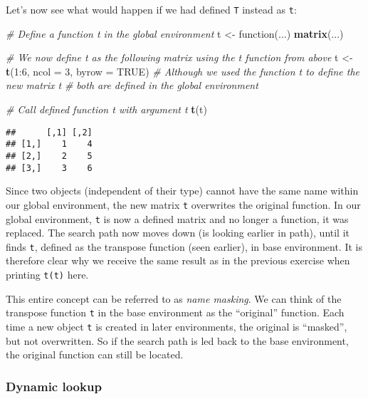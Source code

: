\documentclass[11,]{article}
\newenvironment{Shaded}{\begin{snugshade}}{\end{snugshade}}
\newcommand{\KeywordTok}[1]{\textcolor[rgb]{0.13,0.29,0.53}{\textbf{{#1}}}}
\newcommand{\DataTypeTok}[1]{\textcolor[rgb]{0.13,0.29,0.53}{{#1}}}
\newcommand{\DecValTok}[1]{\textcolor[rgb]{0.00,0.00,0.81}{{#1}}}
\newcommand{\StringTok}[1]{\textcolor[rgb]{0.31,0.60,0.02}{{#1}}}
\newcommand{\CommentTok}[1]{\textcolor[rgb]{0.56,0.35,0.01}{\textit{{#1}}}}
\newcommand{\OtherTok}[1]{\textcolor[rgb]{0.56,0.35,0.01}{{#1}}}
\newcommand{\NormalTok}[1]{{#1}}
\begin{document}
Let's now see what would happen if we had defined \texttt{T} instead as
\texttt{t}:

\begin{Shaded}
\begin{Highlighting}[]
\CommentTok{# Define a function t in the global environment}
\NormalTok{t <-}\StringTok{ }\NormalTok{function(...) }\KeywordTok{matrix}\NormalTok{(...)}

\CommentTok{# We now define t as the following matrix using the t function from above}
\NormalTok{t <-}\StringTok{ }\KeywordTok{t}\NormalTok{(}\DecValTok{1}\NormalTok{:}\DecValTok{6}\NormalTok{, }\DataTypeTok{ncol =} \DecValTok{3}\NormalTok{, }\DataTypeTok{byrow =} \OtherTok{TRUE}\NormalTok{)}
\CommentTok{# Although we used the function t to define the new matrix t}
\CommentTok{# both are defined in the global environment}

\CommentTok{# Call defined function t with argument t}
\KeywordTok{t}\NormalTok{(t)}
\end{Highlighting}
\end{Shaded}

\begin{verbatim}
##      [,1] [,2]
## [1,]    1    4
## [2,]    2    5
## [3,]    3    6
\end{verbatim}

Since two objects (independent of their type) cannot have the same name
within our global environment, the new matrix \texttt{t} overwrites the
original function. In our global environment, \texttt{t} is now a
defined matrix and no longer a function, it was replaced. The search
path now moves down (is looking earlier in path), until it finds
\texttt{t}, defined as the transpose function (seen earlier), in base
environment. It is therefore clear why we receive the same result as in
the previous exercise when printing \texttt{t(t)} here.

This entire concept can be referred to as \emph{name masking}. We can
think of the transpose function \texttt{t} in the base environment as
the ``original'' function. Each time a new object \texttt{t} is created
in later environments, the original is ``masked'', but not overwritten.
So if the search path is led back to the base environment, the original
function can still be located.

\subsubsection{Dynamic lookup}\label{dynamic-lookup}
\end{document}

